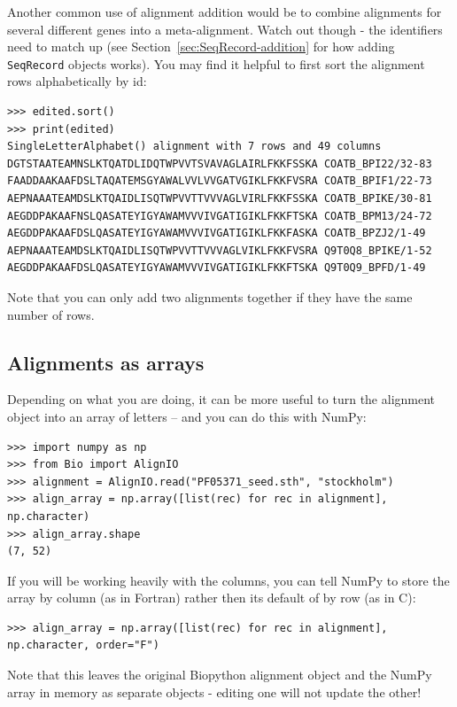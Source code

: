 \documentclass{report}
\begin{document}
Another common use of alignment addition would be to combine alignments for
several different genes into a meta-alignment. Watch out though - the identifiers
need to match up (see Section~\ref{sec:SeqRecord-addition} for how adding
\verb|SeqRecord| objects works). You may find it helpful to first sort the
alignment rows alphabetically by id:

\begin{verbatim}
>>> edited.sort()
>>> print(edited)
SingleLetterAlphabet() alignment with 7 rows and 49 columns
DGTSTAATEAMNSLKTQATDLIDQTWPVVTSVAVAGLAIRLFKKFSSKA COATB_BPI22/32-83
FAADDAAKAAFDSLTAQATEMSGYAWALVVLVVGATVGIKLFKKFVSRA COATB_BPIF1/22-73
AEPNAAATEAMDSLKTQAIDLISQTWPVVTTVVVAGLVIRLFKKFSSKA COATB_BPIKE/30-81
AEGDDPAKAAFNSLQASATEYIGYAWAMVVVIVGATIGIKLFKKFTSKA COATB_BPM13/24-72
AEGDDPAKAAFDSLQASATEYIGYAWAMVVVIVGATIGIKLFKKFASKA COATB_BPZJ2/1-49
AEPNAAATEAMDSLKTQAIDLISQTWPVVTTVVVAGLVIKLFKKFVSRA Q9T0Q8_BPIKE/1-52
AEGDDPAKAAFDSLQASATEYIGYAWAMVVVIVGATIGIKLFKKFTSKA Q9T0Q9_BPFD/1-49
\end{verbatim}

\noindent Note that you can only add two alignments together if they
have the same number of rows.

\subsection{Alignments as arrays}
Depending on what you are doing, it can be more useful to turn the alignment
object into an array of letters -- and you can do this with NumPy:

\begin{verbatim}
>>> import numpy as np
>>> from Bio import AlignIO
>>> alignment = AlignIO.read("PF05371_seed.sth", "stockholm")
>>> align_array = np.array([list(rec) for rec in alignment], np.character)
>>> align_array.shape
(7, 52)
\end{verbatim}

If you will be working heavily with the columns, you can tell NumPy to store
the array by column (as in Fortran) rather then its default of by row (as in C):

\begin{verbatim}
>>> align_array = np.array([list(rec) for rec in alignment], np.character, order="F")
\end{verbatim}

Note that this leaves the original Biopython alignment object and the NumPy array
in memory as separate objects - editing one will not update the other!
\end{document}
